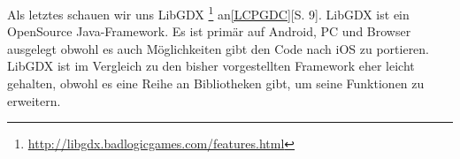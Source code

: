 Als letztes schauen wir uns LibGDX \footnote{\url{http://libgdx.badlogicgames.com/features.html}} an\ref{LCPGDC}[S. 9]. LibGDX ist ein OpenSource Java-Framework. Es ist primär auf Android, PC und Browser ausgelegt obwohl es auch Möglichkeiten gibt den Code nach iOS zu portieren. LibGDX ist im Vergleich zu den bisher vorgestellten Framework eher leicht gehalten, obwohl es eine Reihe an Bibliotheken gibt, um seine Funktionen zu erweitern.